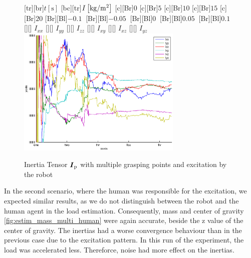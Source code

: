 \begin{figure}
	\centering	
	[tr][br]{$t\left[\mathrm{s}\right]$}
	[bc][tr]{$I\left[\mathrm{kg}/\mathrm{m}^2\right]$}
	[Br]{$0$}
	[Br]{$5$}
	[Br]{$10$}
	[Br]{$15$}
	[Br]{$20$}
	[Br][Bl]{$-0.1\  $}
	[Br][Bl]{$-0.05\ $}
	[Br][Bl]{$0\  $}
	[Br][Bl]{$0.05\  $}
	[Br][Bl]{$0.1\  $}
	[][]{\tiny \hspace{0.2cm} $I_{xx}$}
	[][]{\tiny \hspace{0.2cm} $I_{yy}$}
	[][]{\tiny \hspace{0.2cm} $I_{zz}$}
	[][]{\tiny \hspace{0.2cm} $I_{xy}$}
	[][]{\tiny \hspace{0.2cm} $I_{xz}$}
	[][]{\tiny \hspace{0.2cm} $I_{yz}$}
	\includegraphics[width=0.7\textwidth]{figures/multiple_grasping_points_robot_inertias.eps}
	\vspace{0.2cm}
	\caption[Inertia errors, multiple grasping points, excitation by robot]{Inertia Tensor $\boldsymbol{I}_{\mathrm{p}}$ with multiple grasping points and excitation by the robot}
	\label{fig:estim_inertia_multi_robot}
\end{figure}

In the second scenario, where the human was responsible for the excitation, we expected similar results, as we do not distinguish between the robot and the human agent in the load estimation. Consequently, mass and center of gravity \ref{fig:estim_mass_multi_human} were again accurate, beside the z value of the center of gravity. The inertias had a worse convergence behaviour than in the previous case due to the excitation pattern. In this run of the experiment, the load was accelerated less. Thereforce, noise had more effect on the inertias.

